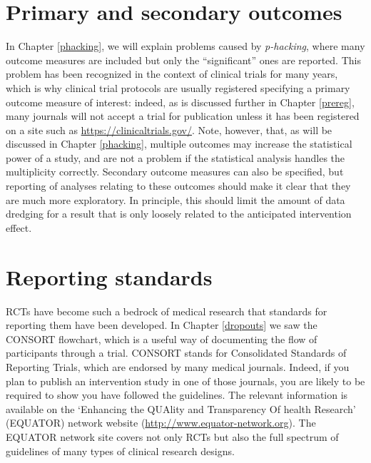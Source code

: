 \documentclass{krantz}
\begin{document}
\hypertarget{primary-and-secondary-outcomes}{%
\section{Primary and secondary outcomes}\label{primary-and-secondary-outcomes}}

In Chapter \ref{phacking}, we will explain problems caused by \emph{p-hacking}, where many outcome measures are included but only the ``significant'' ones are reported. This problem has been recognized in the context of clinical trials for many years, which is why clinical trial protocols are usually registered specifying a primary outcome measure of interest: indeed, as is discussed further in Chapter \ref{prereg}, many journals will not accept a trial for publication unless it has been registered on a site such as \url{https://clinicaltrials.gov/}. Note, however, that, as will be discussed in Chapter \ref{phacking}, multiple outcomes may increase the statistical power of a study, and are not a problem if the statistical analysis handles the multiplicity correctly. Secondary outcome measures can also be specified, but reporting of analyses relating to these outcomes should make it clear that they are much more exploratory. In principle, this should limit the amount of data dredging for a result that is only loosely related to the anticipated intervention effect.

\hypertarget{reporting-standards}{%
\section{Reporting standards}\label{reporting-standards}}

RCTs have become such a bedrock of medical research that standards for reporting them have been developed. In Chapter \ref{dropouts} we saw the CONSORT flowchart, which is a useful way of documenting the flow of participants through a trial. CONSORT stands for Consolidated Standards of Reporting Trials, which are endorsed by many medical journals. Indeed, if you plan to publish an intervention study in one of those journals, you are likely to be required to show you have followed the guidelines. The relevant information is available on the `Enhancing the QUAlity and Transparency Of health Research' (EQUATOR) network website (\url{http://www.equator-network.org}). The EQUATOR network site covers not only RCTs but also the full spectrum of guidelines of many types of clinical research designs.
\end{document}
